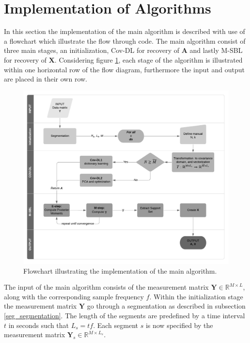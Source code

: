 \section{Implementation of Algorithms}\label{sec:implementation_flow}
In this section the implementation of the main algorithm is described with use of a flowchart which illustrate the flow through code.
The main algorithm consist of three main stages, an initialization, Cov-DL for recovery of $\mathbf{A}$ and lastly M-SBL for recovery of $\mathbf{X}$. 
Considering figure \ref{fig:flow}, each stage of the algorithm is illustrated within one horizontal row of the flow diagram, furthermore the input and output are placed in their own row.    
\begin{figure}[H]
\centering
\includegraphics[scale=0.8]{figures/ch_6/baseline_flowchart.png}
\caption{Flowchart illustrating the implementation of the main algorithm.}
\label{fig:flow}
\end{figure}
\noindent {}
The input of the main algorithm consists of the measurement matrix $\mathbf{Y} \in \mathbb{R}^{M \times L}$, along with the corresponding sample frequency $f$. 
Within the initialization stage the measurement matrix $\mathbf{Y}$ go through a segmentation as described in subsection \ref{seg_segmentation}. 
The length of the segments are predefined by a time interval $t$ in seconds such that $L_{s} = tf$. 
Each segment $s$ is now specified by the measurement matrix $\mathbf{Y}_s \in \mathbb{R}^{M \times L_{s}}$.
